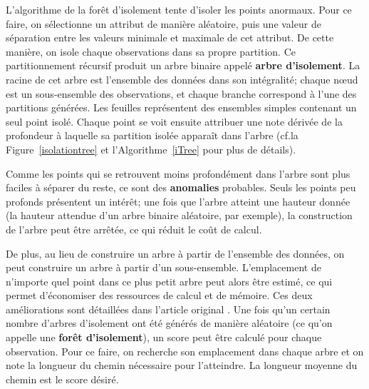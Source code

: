 L'algorithme de la forêt d'isolement tente d'isoler les points anormaux. Pour ce faire, on sélectionne un attribut de manière aléatoire, puis une valeur de séparation entre les valeurs minimale et maximale de cet attribut. De cette mani\`ere, on isole chaque observations dans sa propre partition.
\newl Ce partitionnement récursif produit un arbre binaire appelé \textbf{arbre d'isolement}. La racine de cet arbre est l'ensemble des données dans son intégralité; chaque nœud est un sous-ensemble des observations, et chaque branche correspond à l'une des partitions générées. Les feuilles représentent des ensembles simples contenant un seul point isolé. Chaque point se voit ensuite attribuer une note dérivée de la profondeur à laquelle sa partition isolée apparaît dans l'arbre (cf.\@ la  Figure~\ref{isolationtree} et l'Algorithme~\ref{iTree} pour plus de d\'etails). 
\par Comme les points qui se retrouvent moins profondément dans l'arbre sont plus faciles à séparer du reste, ce sont des \textbf{anomalies} probables. Seuls les points peu profonds présentent un intérêt; une fois que l'arbre atteint une hauteur donnée (la hauteur attendue d'un arbre binaire aléatoire, par exemple), la construction de l'arbre peut être arrêtée, ce qui réduit le coût de calcul. \par 
De plus, au lieu de construire un arbre à partir de l'ensemble des données, on peut construire un arbre à partir d'un sous-ensemble. L'emplacement de n'importe quel point dans ce plus petit arbre peut alors être estimé, ce qui permet d'économiser des ressources de calcul et de mémoire. Ces deux améliorations sont détaillées dans l'article original \cite{A15}. 
\newl Une fois qu'un certain nombre d'arbres d'isolement ont été générés de manière aléatoire (ce qu'on appelle une \textbf{forêt d'isolement}), un score peut être calculé pour chaque observation. Pour ce faire, on recherche son emplacement dans chaque arbre et on note la longueur du chemin nécessaire pour l'atteindre. La longueur moyenne du chemin est le score d\'esir\'e.
\newpage 
